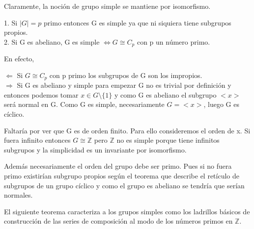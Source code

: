 Claramente, la noción de grupo simple se mantiene por isomorfismo.

\begin{ejemplo}
1. Si $|G| = p$ primo entonces G es simple ya que ni siquiera tiene subgrupos propios. \\
2. Si G es abeliano, G es simple $\iff G \cong C_p$ con p un número primo.

En efecto, 

$\Leftarrow$ Si $G \cong C_p$ con p primo los subgrupos de G son los impropios. \\
$\Rightarrow$ Si G es abeliano y simple para empezar G no es trivial por definición y entonces podemos tomar $x \in G \setminus \{1\}$ y como G es abeliano el subgrupo $<x>$ será normal en G. Como G es simple, necesariamente $G = <x>$, luego G es cíclico.

Faltaría por ver que G es de orden finito. Para ello consideremos el orden de x. Si fuera infinito entonces $G \cong \mathbb{Z}$ pero $\mathbb{Z}$ no es simple porque tiene infinitos subgrupos y la simplicidad es un invariante por isomorfismo.

Además necesariamente el orden del grupo debe ser primo. Pues si no fuera primo existirían subgrupo propios según el teorema que describe el retículo de subgrupos de un grupo cíclico y como el grupo es abeliano se tendría que serían normales.
\end{ejemplo}

El siguiente teorema caracteriza a los grupos simples como los ladrillos básicos de construcción de las series de composición al modo de los números primos en $\mathbb{Z}$.

